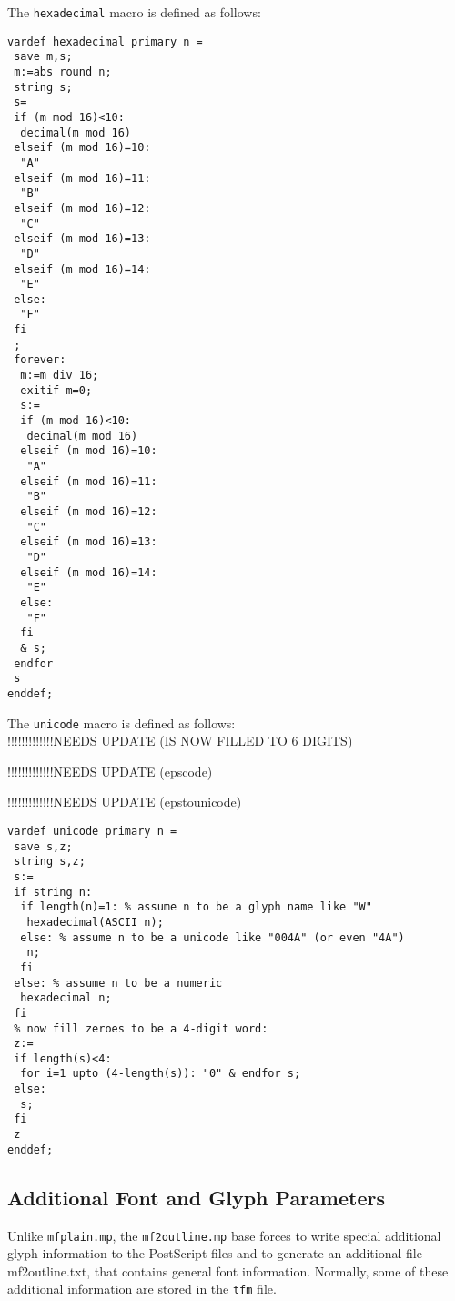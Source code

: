 \documentclass{scrartcl}
\begin{document}
%
The \texttt{hexadecimal} macro is defined as follows:
%
\lstset{language=MetaPost,columns=fullflexible}
\begin{lstlisting}
vardef hexadecimal primary n =
 save m,s;
 m:=abs round n; 
 string s; 
 s=
 if (m mod 16)<10:
  decimal(m mod 16)
 elseif (m mod 16)=10:
  "A"
 elseif (m mod 16)=11:
  "B"
 elseif (m mod 16)=12:
  "C"
 elseif (m mod 16)=13:
  "D"
 elseif (m mod 16)=14:
  "E"
 else:
  "F"
 fi
 ;
 forever:
  m:=m div 16; 
  exitif m=0;
  s:=
  if (m mod 16)<10:
   decimal(m mod 16)
  elseif (m mod 16)=10:
   "A"
  elseif (m mod 16)=11:
   "B"
  elseif (m mod 16)=12:
   "C"
  elseif (m mod 16)=13:
   "D"
  elseif (m mod 16)=14:
   "E"
  else:
   "F"
  fi
  & s; 
 endfor
 s
enddef;
\end{lstlisting}
%
The \texttt{unicode} macro is defined as follows:\\
!!!!!!!!!!!!!NEEDS UPDATE (IS NOW FILLED TO 6 DIGITS)

!!!!!!!!!!!!!NEEDS UPDATE (epscode)

!!!!!!!!!!!!!NEEDS UPDATE (epstounicode)
%
\lstset{language=MetaPost,columns=fullflexible}
\begin{lstlisting}
vardef unicode primary n = 
 save s,z;
 string s,z;
 s:=
 if string n:
  if length(n)=1: % assume n to be a glyph name like "W"
   hexadecimal(ASCII n);
  else: % assume n to be a unicode like "004A" (or even "4A")
   n;
  fi
 else: % assume n to be a numeric 
  hexadecimal n;
 fi 
 % now fill zeroes to be a 4-digit word:
 z:=
 if length(s)<4:
  for i=1 upto (4-length(s)): "0" & endfor s;
 else:
  s;
 fi
 z
enddef;
\end{lstlisting}
%
\subsection{Additional Font and Glyph Parameters}
%
Unlike \texttt{mfplain.mp}, the \texttt{mf2outline.mp} base forces \MP{} to write special additional glyph information to the PostScript files and to generate an additional file mf2outline.txt, that contains general font information. Normally, some of these additional information are stored in the \texttt{tfm} file.
%
\end{document}
